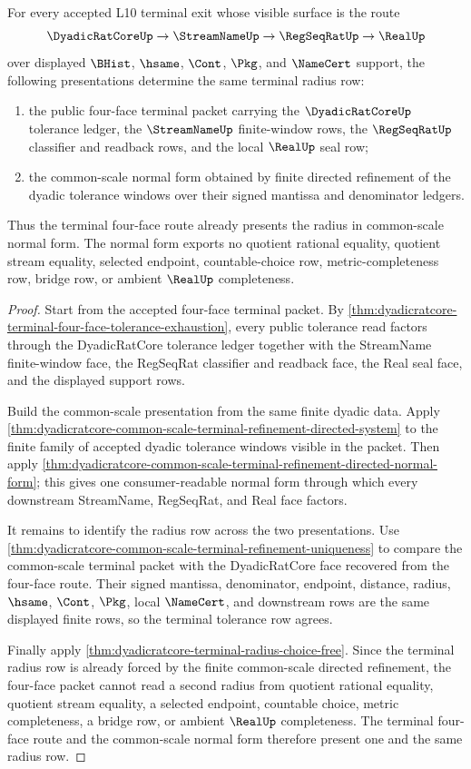 \begin{theorem}
\label{thm:dyadicratcore-common-scale-normal-form}
For every accepted L10 terminal exit whose visible surface is the route
$$
\DyadicRatCoreUp \to \StreamNameUp \to \RegSeqRatUp \to \RealUp
$$
over displayed $\BHist$, $\hsame$, $\Cont$, $\Pkg$, and $\NameCert$ support, the following presentations determine the same terminal radius row:
\begin{enumerate}
\item the public four-face terminal packet carrying the $\DyadicRatCoreUp$ tolerance ledger, the $\StreamNameUp$ finite-window rows, the $\RegSeqRatUp$ classifier and readback rows, and the local $\RealUp$ seal row;
\item the common-scale normal form obtained by finite directed refinement of the dyadic tolerance windows over their signed mantissa and denominator ledgers.
\end{enumerate}
Thus the terminal four-face route already presents the radius in common-scale normal form. The normal form exports no quotient rational equality, quotient stream equality, selected endpoint, countable-choice row, metric-completeness row, bridge row, or ambient $\RealUp$ completeness.
\end{theorem}
\begin{proof}
Start from the accepted four-face terminal packet. By \autoref{thm:dyadicratcore-terminal-four-face-tolerance-exhaustion}, every public tolerance read factors through the DyadicRatCore tolerance ledger together with the StreamName finite-window face, the RegSeqRat classifier and readback face, the Real seal face, and the displayed support rows.

Build the common-scale presentation from the same finite dyadic data. Apply \autoref{thm:dyadicratcore-common-scale-terminal-refinement-directed-system} to the finite family of accepted dyadic tolerance windows visible in the packet. Then apply \autoref{thm:dyadicratcore-common-scale-terminal-refinement-directed-normal-form}; this gives one consumer-readable normal form through which every downstream StreamName, RegSeqRat, and Real face factors.

It remains to identify the radius row across the two presentations. Use \autoref{thm:dyadicratcore-common-scale-terminal-refinement-uniqueness} to compare the common-scale terminal packet with the DyadicRatCore face recovered from the four-face route. Their signed mantissa, denominator, endpoint, distance, radius, $\hsame$, $\Cont$, $\Pkg$, local $\NameCert$, and downstream rows are the same displayed finite rows, so the terminal tolerance row agrees.

Finally apply \autoref{thm:dyadicratcore-terminal-radius-choice-free}. Since the terminal radius row is already forced by the finite common-scale directed refinement, the four-face packet cannot read a second radius from quotient rational equality, quotient stream equality, a selected endpoint, countable choice, metric completeness, a bridge row, or ambient $\RealUp$ completeness. The terminal four-face route and the common-scale normal form therefore present one and the same radius row.
\end{proof}

